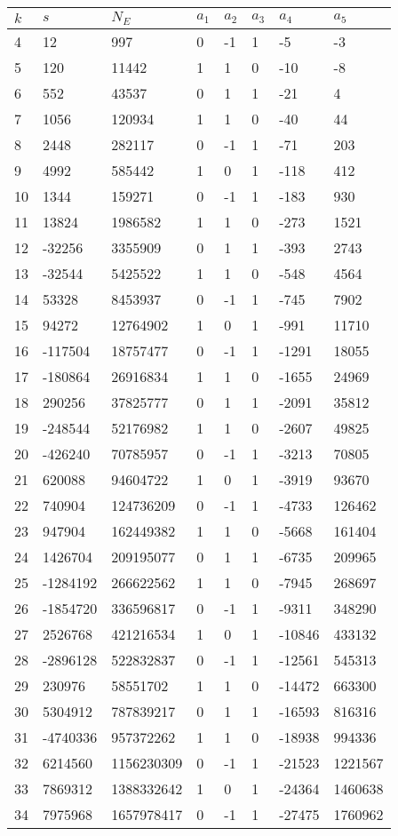 \documentclass{amsart}
\begin{document}
\begin{longtable}{|l|l|l|lllll|}
\hline
$k$ & $s$ & $N_E$ & $a_1$ & $a_2$ & $a_3$ & $a_4$ & $a_5$\\
\hline
4&12&997&0&-1&1&-5&-3\\
5&120&11442&1&1&0&-10&-8\\
6&552&43537&0&1&1&-21&4\\
7&1056&120934&1&1&0&-40&44\\
8&2448&282117&0&-1&1&-71&203\\
9&4992&585442&1&0&1&-118&412\\
10&1344&159271&0&-1&1&-183&930\\
11&13824&1986582&1&1&0&-273&1521\\
12&-32256&3355909&0&1&1&-393&2743\\
13&-32544&5425522&1&1&0&-548&4564\\
14&53328&8453937&0&-1&1&-745&7902\\
15&94272&12764902&1&0&1&-991&11710\\
16&-117504&18757477&0&-1&1&-1291&18055\\
17&-180864&26916834&1&1&0&-1655&24969\\
18&290256&37825777&0&1&1&-2091&35812\\
19&-248544&52176982&1&1&0&-2607&49825\\
20&-426240&70785957&0&-1&1&-3213&70805\\
21&620088&94604722&1&0&1&-3919&93670\\
22&740904&124736209&0&-1&1&-4733&126462\\
23&947904&162449382&1&1&0&-5668&161404\\
24&1426704&209195077&0&1&1&-6735&209965\\
25&-1284192&266622562&1&1&0&-7945&268697\\
26&-1854720&336596817&0&-1&1&-9311&348290\\
27&2526768&421216534&1&0&1&-10846&433132\\
28&-2896128&522832837&0&-1&1&-12561&545313\\
29&230976&58551702&1&1&0&-14472&663300\\
30&5304912&787839217&0&1&1&-16593&816316\\
31&-4740336&957372262&1&1&0&-18938&994336\\
32&6214560&1156230309&0&-1&1&-21523&1221567\\
33&7869312&1388332642&1&0&1&-24364&1460638\\
34&7975968&1657978417&0&-1&1&-27475&1760962\\

\end{longtable}
\end{document}
